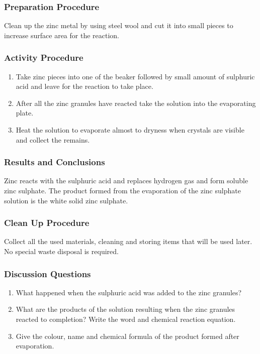 \subsubsection*{Preparation Procedure}
Clean up the zinc metal by using steel wool and cut it into small pieces to increase surface area for the reaction.

\subsubsection*{Activity Procedure}
\begin{enumerate}
\item{Take zinc pieces into one of the beaker followed by small amount of sulphuric acid and leave for the reaction to take place.}
\item{After all the zinc granules have reacted take the solution into the evaporating plate.}
\item{Heat the solution to evaporate almost to dryness when crystals are visible and collect the remains.}
\end{enumerate}

\subsubsection*{Results and Conclusions}
Zinc reacts with the sulphuric acid and replaces hydrogen gas and form soluble zinc sulphate. The product formed from the evaporation of the zinc sulphate solution is the white solid zinc sulphate.

\subsubsection*{Clean Up Procedure}
Collect all the used materials, cleaning and storing items that will be used later. No special waste disposal is required.

\subsubsection*{Discussion Questions}
\begin{enumerate}
\item{What happened when the sulphuric acid was added to the zinc granules?}
\item{What are the products of the solution resulting when the zinc granules reacted to completion? Write the word and chemical reaction equation.}
\item{Give the colour, name and chemical formula of the product formed after evaporation.}
\end{enumerate}

